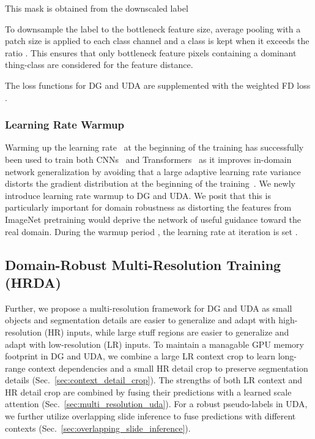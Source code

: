 \documentclass[journal,compsoc]{IEEEtran}
\begin{document}
This mask is obtained from the downscaled label 

To downsample the label to the bottleneck feature size, average pooling with a patch size  is applied to each class channel and a class is kept when it exceeds the ratio .
This ensures that only bottleneck feature pixels containing a dominant thing-class are considered for the feature distance.

The loss functions for DG and UDA are supplemented with the weighted FD loss .

\subsubsection{Learning Rate Warmup}
\label{sec:methods_warmup}

Warming up the learning rate~\cite{goyal2017accurate} at the beginning of the training has successfully been used to train both CNNs~\cite{he2016deep} and Transformers~\cite{vaswani2017attention, dosovitskiy2020image} as it improves in-domain network generalization by avoiding that a large adaptive learning rate variance distorts the gradient distribution at the beginning of the training~\cite{liu2019variance}. We newly introduce learning rate warmup to DG and UDA. We posit that this is particularly important for domain robustness as distorting the features from ImageNet pretraining would deprive the network of useful guidance toward the real domain. During the warmup period , the learning rate at iteration  is set .


\subsection{Domain-Robust Multi-Resolution Training (HRDA)}
\label{sec:methods_hrda}

Further, we propose a multi-resolution framework for DG and UDA as small objects and segmentation details are easier to generalize and adapt with high-resolution (HR) inputs, while large stuff regions are easier to generalize and adapt with low-resolution (LR) inputs.
To maintain a managable GPU memory footprint in DG and UDA, we combine a large LR context crop to learn long-range context dependencies and a small HR detail crop to preserve segmentation details (Sec.~\ref{sec:context_detail_crop}). The strengths of both LR context and HR detail crop are combined by fusing their predictions with a learned scale attention (Sec.~\ref{sec:multi_resolution_uda}).
For a robust pseudo-labels in UDA, we further utilize overlapping slide inference to fuse predictions with different contexts (Sec.~\ref{sec:overlapping_slide_inference}).
\end{document}
